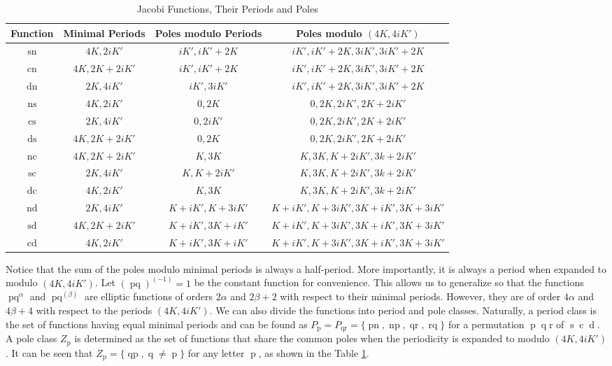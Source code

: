 \documentclass{amsart}
\theoremstyle{definition}
\DeclareMathOperator{\ns}{ns}
\DeclareMathOperator{\nc}{nc}
\DeclareMathOperator{\dn}{dn}
\DeclareMathOperator{\ds}{ds}
\DeclareMathOperator{\cs}{cs}
\DeclareMathOperator{\sn}{sn}
\DeclareMathOperator{\cn}{cn}
\DeclareMathOperator{\nd}{nd}
\DeclareMathOperator{\scJ}{sc}
\DeclareMathOperator{\cd}{cd}
\DeclareMathOperator{\dc}{dc}
\DeclareMathOperator{\sd}{sd}
\DeclareMathOperator{\pq}{pq}
\DeclareMathOperator{\qp}{qp}
\DeclareMathOperator{\pn}{pn}
\DeclareMathOperator{\np}{np}
\DeclareMathOperator{\qr}{qr}
\DeclareMathOperator{\rqJ}{rq}
\DeclareMathOperator{\p}{p}
\DeclareMathOperator{\q}{q}
\DeclareMathOperator{\s}{s}
\DeclareMathOperator{\cJ}{c}
\DeclareMathOperator{\dJ}{d}
\begin{document}
\begin{center}
\begin{table}[h]
\begin{tabular}{|c|c|c|c|}
\hline
Function & Minimal Periods & Poles modulo Periods & Poles modulo $(4K,4iK')$ \\ \hline
$\sn$ & $4K,2iK'$ & $iK',iK'+2K$ & $iK',iK'+2K,3iK',3iK'+2K$ \\ \hline
$\cn$ & $4K,2K+2iK'$ &  $iK',iK'+2K$ & $iK',iK'+2K,3iK',3iK'+2K$ \\ \hline
$\dn$ & $2K,4iK'$ &  $iK',3iK'$ & $iK',iK'+2K,3iK',3iK'+2K$ \\ \hline
$\ns$ & $4K,2iK'$ & $0,2K$ & $0,2K,2iK',2K+2iK'$ \\ \hline
$\cs$ & $2K,4iK'$ & $0,2iK'$ & $0,2K,2iK',2K+2iK'$ \\ \hline
$\ds$ & $4K,2K+2iK'$ & $0,2K$ & $0,2K,2iK',2K+2iK'$ \\ \hline
$\nc$ & $4K,2K+2iK'$ & $K,3K$ & $K,3K,K+2iK',3k+2iK'$ \\ \hline
$\scJ$ & $2K,4iK'$ & $K,K+2iK'$ & $K,3K,K+2iK',3k+2iK'$ \\ \hline
$\dc$ & $4K,2iK'$ & $K,3K$ & $K,3K,K+2iK',3k+2iK'$ \\ \hline
$\nd$ & $2K,4iK'$ & $K+iK',K+3iK'$ & $K+iK',K+3iK',3K+iK',3K+3iK'$ \\ \hline
$\sd$ & $4K,2K+2iK'$ & $K+iK',3K+iK'$ & $K+iK',K+3iK',3K+iK',3K+3iK'$ \\ \hline
$\cd$ & $4K,2iK'$ & $K+iK',3K+iK'$ & $K+iK',K+3iK',3K+iK',3K+3iK'$ \\ \hline
\end{tabular}\medskip
\caption{Jacobi Functions, Their Periods and Poles}
\label{periodtable}
\end{table}
\end{center}
Notice that the sum of the poles modulo minimal periods is always a half-period. More importantly, it is always a period when expanded to modulo $(4K,4iK')$. Let $(\pq)^{(-1)}=1$ be the constant function for convenience. This allows us to generalize so that the functions $\pq^{\alpha}$ and $\pq^{(\beta)}$ are elliptic functions of orders $2\alpha$ and $2\beta+2$ with respect to their minimal periods. However, they are of order $4\alpha$ and $4\beta+4$ with respect to the periods $(4K,4iK')$. We can also divide the functions into period and pole classes. Naturally, a period class is the set of functions having equal minimal periods and can be found as $P_{\p}=P_{\qr}=\{\pn,\np,\qr,\rqJ\}$ for a permutation $\p\q\text{r}$ of $\s\cJ\dJ$. A pole class $Z_{\p}$ is determined as the set of functions that share the common poles when the periodicity is expanded to modulo $(4K,4iK')$. It can be seen that $Z_{\p}=\{\qp, \q\neq \p\}$ for any letter $\p$, as shown in the Table \ref{periodtable}. \medskip
 
\end{document}
